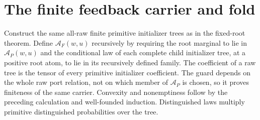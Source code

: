\documentclass[11pt]{article}
\begin{document}
\section{The finite feedback carrier and fold}
Construct the same all-raw finite primitive initializer trees as in the fixed-root theorem. Define $\mathcal A_F(w,u)$ recursively by requiring the root marginal to lie in $\mathcal A_P(w,u)$ and the conditional law of each complete child initializer tree, at a positive root atom, to lie in its recursively defined family. The coefficient of a raw tree is the tensor of every primitive initializer coefficient. The guard depends on the whole raw port relation, not on which member of $\mathcal A_P$ is chosen, so it proves finiteness of the same carrier. Convexity and nonemptiness follow by the preceding calculation and well-founded induction. Distinguished laws multiply primitive distinguished probabilities over the tree.
\end{document}
